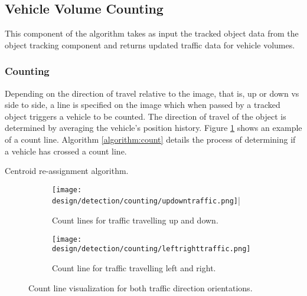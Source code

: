 \subsection{Vehicle Volume Counting}
\label{subsection:count_measure}

This component of the algorithm takes as input the tracked object data from the object tracking component and returns updated traffic data for vehicle volumes. 

\subsubsection{Counting}

Depending on the direction of travel relative to the image, that is, up or down vs side to side, a line is specified on the image which when passed by a tracked object triggers a vehicle to be counted. The direction of travel of the object is determined by averaging the vehicle's position history. Figure \ref{fig:count_lines} shows an example of a count line. Algorithm \ref{algorithm:count} details the process of determining if a vehicle has crossed a count line.

\begin{algorithm}
	\SetAlgoLined
	
	
	\caption{Centroid re-assignment algorithm. \cite{adrian_rosebrock_vehicle_tracking}}
	\label{algorithm:count}
  \end{algorithm}

\begin{figure}[H]
	\centering
	\begin{subfigure}[b]{0.42\textwidth}
            \centering\texttt{[image: design/detection/counting/updowntraffic.png]}|
            \captionsetup{format = hang}  
      		\caption{Count lines for traffic travelling up and down.}
    	\end{subfigure}
    	\begin{subfigure}[b]{0.42\textwidth}
      		\centering\texttt{[image: design/detection/counting/leftrighttraffic.png]}
            \captionsetup{format = hang}    
            \caption{Count line for traffic travelling left and right.}
        \end{subfigure}
        \captionsetup{format = hang}
    	\caption{Count line visualization for both traffic direction orientations.}
    	\label{fig:count_lines}
\end{figure}

